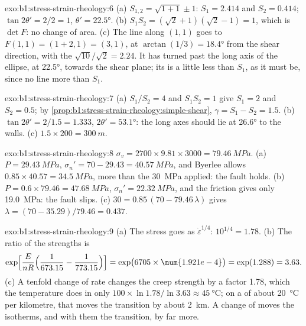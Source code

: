 \begin{solution}{exo:b1:stress-strain-rheology:6}
(a) $S_{1,2} = \sqrt{1 + 1} \pm 1$: $S_1 = 2.414$ and $S_2 = 0.414$;
$\tan2\theta' = 2/2 = 1$, $\theta' = \ang{22.5}$. (b) $S_1S_2 =
(\sqrt2 + 1)(\sqrt2 - 1) = 1$, which is $\det F$: no change of area. (c) The
line along $(1, 1)$ goes to $F(1, 1) = (1 + 2, 1) = (3, 1)$, at
$\arctan(1/3) = \ang{18.4}$ from the shear direction, with the 
$\sqrt{10}/\sqrt2 = 2.24$. It has turned past the long axis of the ellipse,
at \ang{22.5}, towards the shear plane; its  is a little less than
$S_1$, as it must be, since no line  more than $S_1$.
\end{solution}

\begin{solution}{exo:b1:stress-strain-rheology:7}
(a) $S_1/S_2 = 4$ and $S_1S_2 = 1$ give $S_1 = 2$ and $S_2 = 0.5$; by
\cref{prop:b1:stress-strain-rheology:simple-shear}, $\gamma = S_1 - S_2 =
1.5$. (b) $\tan2\theta' = 2/1.5 = 1.333$, $2\theta' = \ang{53.1}$: the long
axes should lie at \ang{26.6} to the walls. (c) $1.5\times200 = \qty{300}{m}$.
\end{solution}

\begin{solution}{exo:b1:stress-strain-rheology:8}
$\sigma_v = 2700\times9.81\times3000 = \qty{79.46}{MPa}$. (a) $P = \qty{29.43}{MPa}$,
$\sigma_n' = 70 - 29.43 = \qty{40.57}{MPa}$, and Byerlee allows
$0.85\times40.57 = \qty{34.5}{MPa}$, more than the \qty{30}{MPa} applied: the
fault holds. (b) $P = 0.6\times79.46 = \qty{47.68}{MPa}$, $\sigma_n' =
\qty{22.32}{MPa}$, and the friction gives only \qty{19.0}{MPa}: the fault
slips. (c) $30 = 0.85\,(70 - 79.46\,\lambda)$ gives $\lambda = (70 -
35.29)/79.46 = 0.437$.
\end{solution}

\begin{solution}{exo:b1:stress-strain-rheology:9}
(a) The stress goes as $\dot\varepsilon^{1/4}$: $10^{1/4} = 1.78$. (b) The
ratio of the strengths is
\[
  \exp\Bigl[\frac{E}{nR}\Bigl(\frac{1}{673.15} - \frac{1}{773.15}\Bigr)\Bigr]
  = \exp\bigl(6705\times\num{1.921e-4}\bigr) = \exp(1.288) = 3.63 .
\]
(c) A tenfold change of rate changes the creep strength by a factor 1.78,
which the temperature does in only $100\times\ln1.78/\ln3.63 \approx
\qty{45}{\degreeCelsius}$; on a  of about \qty{20}{\degreeCelsius}
per kilometre, that moves the transition by about \qty{2}{km}. A change of
 moves the isotherms, and with them the transition, by far more.
\end{solution}


